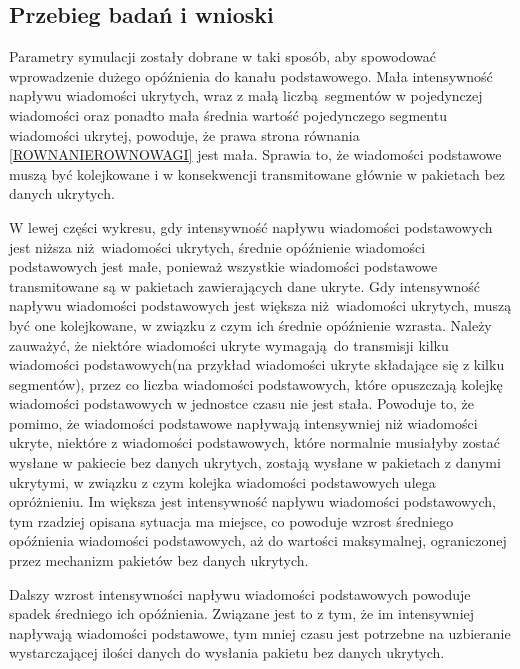 \documentclass[a4paper, twoside, 12pt]{report}
\begin{document}
        \subsection{Przebieg badań i wnioski}
            Parametry symulacji zostały dobrane w taki sposób, aby spowodować
            wprowadzenie dużego opóźnienia do kanału podstawowego. Mała intensywność
            napływu wiadomości ukrytych, wraz z małą liczbą segmentów w pojedynczej
            wiadomości oraz ponadto mała średnia wartość pojedynczego segmentu
            wiadomości ukrytej, powoduje, że prawa strona równania \ref{ROWNANIEROWNOWAGI}
            jest mała. Sprawia to, że wiadomości podstawowe muszą być kolejkowane i
            w konsekwencji transmitowane głównie w pakietach bez danych ukrytych.

            W lewej części wykresu, gdy intensywność napływu wiadomości podstawowych
            jest niższa niż wiadomości ukrytych, średnie opóźnienie wiadomości
            podstawowych jest małe, ponieważ wszystkie wiadomości podstawowe transmitowane
            są w pakietach zawierających dane ukryte. Gdy intensywność napływu wiadomości
            podstawowych jest większa niż wiadomości ukrytych, muszą być one kolejkowane,
            w związku z czym ich średnie opóźnienie wzrasta. Należy zauważyć, że
            niektóre wiadomości ukryte wymagają do transmisji kilku wiadomości
            podstawowych(na przykład wiadomości ukryte składające się z kilku segmentów),
            przez co liczba wiadomości podstawowych, które opuszczają kolejkę wiadomości
            podstawowych w jednostce czasu nie jest stała. Powoduje to, że pomimo,
            że wiadomości podstawowe napływają intensywniej niż wiadomości ukryte,
            niektóre z wiadomości podstawowych, które normalnie musiałyby zostać
            wysłane w pakiecie bez danych ukrytych, zostają wysłane w pakietach
            z danymi ukrytymi, w związku z czym kolejka wiadomości podstawowych
            ulega opróżnieniu. Im większa jest intensywność napływu wiadomości
            podstawowych, tym rzadziej opisana sytuacja ma miejsce, co powoduje
            wzrost średniego opóźnienia wiadomości podstawowych, aż do wartości
            maksymalnej, ograniczonej przez mechanizm pakietów bez danych ukrytych.

            Dalszy wzrost intensywności napływu wiadomości podstawowych powoduje
            spadek średniego ich opóźnienia. Związane jest to z tym, że im intensywniej
            napływają wiadomości podstawowe, tym mniej czasu jest potrzebne na uzbieranie
            wystarczającej ilości danych do wysłania pakietu bez danych ukrytych.
\end{document}
